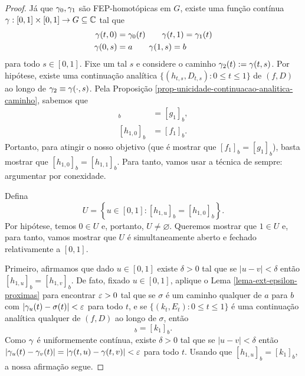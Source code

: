     \begin{proof}
        Já que $\gamma_0, \gamma_1$ são FEP-homotópicas em $G$, existe uma função contínua
        $\gamma: [0,1]\times[0,1]\to G\subseteq\mathbb{C}$ tal que
        \begin{align*}
            \gamma(t,0) &= \gamma_0(t) \qquad \gamma(t,1) = \gamma_1(t) \\
            \gamma(0,s) &= a \qquad \gamma(1,s) = b
        \end{align*}
        para todo $s\in [0,1]$. Fixe um tal $s$ e considere o caminho 
        $\gamma_2(t) := \gamma(t,s)$. Por hipótese, existe uma continuação analítica
        $\{ (h_{t,s}, D_{t,s}) : 0\leq t\leq 1 \}$ de $(f,D)$ ao longo de 
        $\gamma_2 \equiv \gamma(\cdot, s)$. Pela 
        Proposição \ref{prop-unicidade-continuacao-analitica-caminho}, sabemos que
        \begin{align*}
            [h_{1,1}]_b &= [g_1]_b, \\
            [h_{1,0}]_b &= [f_1]_b.
        \end{align*}
        Portanto, para atingir o nosso objetivo (que é mostrar que $[f_1]_b = [g_1]_b$),
        basta mostrar que $[h_{1,0}]_b = [h_{1,1}]_b$. Para tanto, vamos usar a técnica
        de sempre: argumentar por conexidade.
        
        Defina
        \begin{equation*}
            U = \left\{ u\in [0,1] : [h_{1,u}]_b = [h_{1,0}]_b \right\}.
        \end{equation*}
        Por hipótese, temos $0\in U$ e, portanto, $U\neq\varnothing$. Queremos mostrar que
        $1\in U$ e, para tanto, vamos mostrar que $U$ é simultaneamente aberto e fechado
        relativamente a $[0,1]$.
        
        Primeiro, afirmamos que dado $u\in [0,1]$ existe $\delta > 0$ tal que se 
        $|u - v| < \delta$ então $[h_{1,u}]_b = [h_{1,v}]_b$. De fato, fixado $u\in [0,1]$,
        aplique o Lema \ref{lema-ext-epsilon-proximas} para encontrar $\varepsilon > 0$
        tal que se $\sigma$ é um caminho qualquer de $a$ para $b$ com 
        $|\gamma_u(t) - \sigma(t)| < \varepsilon$ para todo $t$, e se 
        $\{ (k_t, E_t): 0\leq t\leq 1 \}$ é uma continuação analítica qualquer de $(f,D)$
        ao longo de $\sigma$, então
        \begin{equation*}
            [h_{1,u}]_b = [k_1]_b.
        \end{equation*}
        Como $\gamma$ é uniformemente contínua, existe $\delta > 0$ tal que se $|u-v|<\delta$
        então $|\gamma_u(t) - \gamma_v(t)| = |\gamma(t,u) - \gamma(t,v)| < \varepsilon$
        para todo $t$. Usando que $[h_{1,u}]_b = [k_1]_b$, a nossa afirmação segue.
        

\end{proof}
